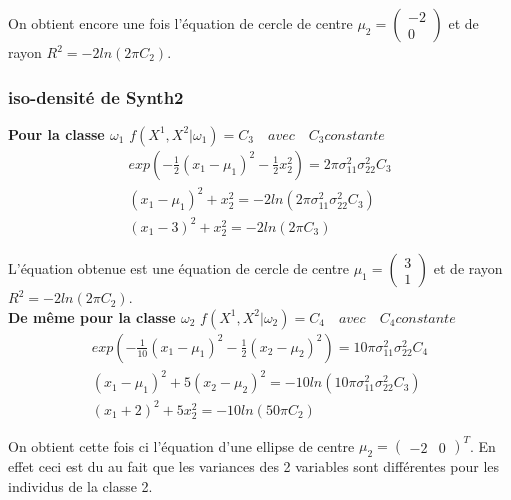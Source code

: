 \documentclass[10pt]{article}
\begin{document}
 On obtient encore une fois l'équation de cercle de centre $\mu_{2} = \begin{pmatrix} -2 \\ 0\end{pmatrix} $ et de rayon $R^{2} = -2 ln(2\pi C_{2})$.\\


\subsubsection{iso-densité de Synth2}
\textbf{Pour la classe $\omega_{1}$} $f(X^{1}, X^{2}|\omega_{1}) = C_{3} \quad avec \quad C_{3} constante$
\begin{equation}
\begin{split}
exp(-\frac{1}{2} (x_{1}-\mu_{1})^{2} - \frac{1}{2}x_{2}^{2})  = 2 \pi \sigma_{11}^{2} \sigma_{22}^{2} C_{3}
\\
(x_{1} - \mu_{1})^{2} +  x_{2}^{2} = -2ln(2 \pi \sigma_{11}^{2} \sigma_{22}^{2} C_{3})
\\
(x_{1} - 3)^{2} + x_{2}^{2} = -2 ln(2\pi C_{3})
\end{split}
\label{9}
\end{equation}

L'équation obtenue est une équation de cercle de centre $\mu_{1} = \begin{pmatrix} 3 \\ 1\end{pmatrix} $ et de rayon $R^{2} = -2 ln(2\pi C_{2})$.\\

\textbf{De même pour la classe $\omega_{2}$} $f(X^{1}, X^{2}|\omega_{2}) = C_{4} \quad avec \quad C_{4} constante$
\begin{equation}
\begin{split}
exp(-\frac{1}{10} (x_{1}-\mu_{1})^{2} - \frac{1}{2}(x_{2}-\mu_{2})^{2})  = 10 \pi \sigma_{11}^{2} \sigma_{22}^{2} C_{4}
\\
(x_{1} - \mu_{1})^{2} +  5(x_{2}-\mu_{2})^{2}  = -10ln(10 \pi \sigma_{11}^{2} \sigma_{22}^{2} C_{3})
\\
(x_{1} + 2)^{2} + 5x_{2}^{2} = -10ln(50\pi C_{2})
\label{10}
\end{split}
\end{equation}

On obtient cette fois ci l'équation d'une ellipse de centre $\mu_{2} = \begin{pmatrix} -2 & 0\end{pmatrix}^{T}$. En effet ceci est du au fait que les variances des 2 variables sont différentes pour les individus de la classe 2.
\end{document}
